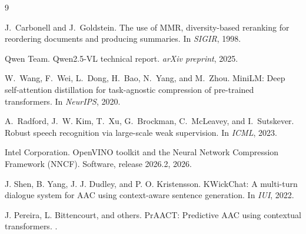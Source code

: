 \begin{thebibliography}{9}

J.~Carbonell and J.~Goldstein.
\newblock The use of MMR, diversity-based reranking for reordering documents and
producing summaries.
\newblock In \emph{SIGIR}, 1998.

Qwen Team.
\newblock Qwen2.5-VL technical report.
\newblock \emph{arXiv preprint}, 2025.

W.~Wang, F.~Wei, L.~Dong, H.~Bao, N.~Yang, and M.~Zhou.
\newblock MiniLM: Deep self-attention distillation for task-agnostic compression
of pre-trained transformers.
\newblock In \emph{NeurIPS}, 2020.

A.~Radford, J.~W. Kim, T.~Xu, G.~Brockman, C.~McLeavey, and I.~Sutskever.
\newblock Robust speech recognition via large-scale weak supervision.
\newblock In \emph{ICML}, 2023.

Intel Corporation.
\newblock OpenVINO toolkit and the Neural Network Compression Framework (NNCF).
\newblock Software, release 2026.2, 2026.

J. Shen, B. Yang, J. J. Dudley, and P. O. Kristensson.
\newblock KWickChat: A multi-turn dialogue system for AAC using context-aware
sentence generation.
\newblock In \emph{IUI}, 2022.

J. Pereira, L. Bittencourt, and others.
\newblock PrAACT: Predictive AAC using contextual transformers.
.

\end{thebibliography}

\appendix
